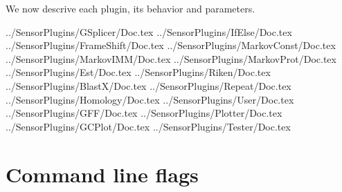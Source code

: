 \documentclass[a4paper,titlepage]{report}
\begin{document}
We now descrive each plugin, its behavior and parameters.











 {../SensorPlugins/GSplicer/Doc.tex}
 {../SensorPlugins/IfElse/Doc.tex}
 {../SensorPlugins/FrameShift/Doc.tex}
 {../SensorPlugins/MarkovConst/Doc.tex}
 {../SensorPlugins/MarkovIMM/Doc.tex}
 {../SensorPlugins/MarkovProt/Doc.tex}
 {../SensorPlugins/Est/Doc.tex}
 {../SensorPlugins/Riken/Doc.tex}
 {../SensorPlugins/BlastX/Doc.tex}
 {../SensorPlugins/Repeat/Doc.tex}
 {../SensorPlugins/Homology/Doc.tex}
 {../SensorPlugins/User/Doc.tex}
 {../SensorPlugins/GFF/Doc.tex}
 {../SensorPlugins/Plotter/Doc.tex}
 {../SensorPlugins/GCPlot/Doc.tex}
 {../SensorPlugins/Tester/Doc.tex}

\section{Command line flags}
 
\end{document}
